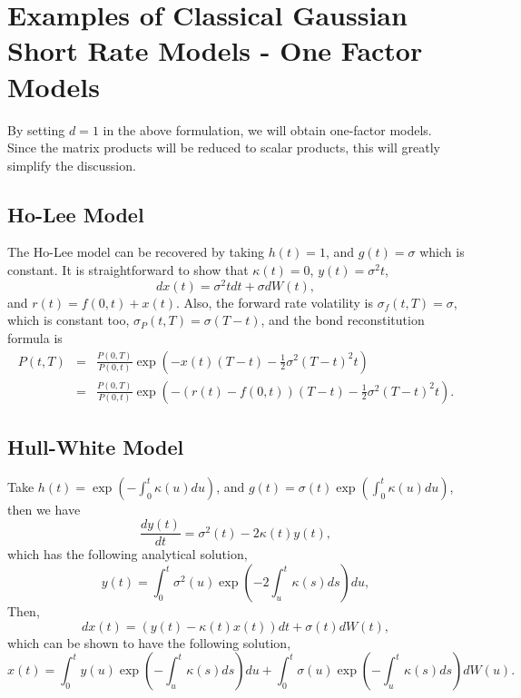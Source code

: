 \documentclass[12pt]{article}
\begin{document}
\section{Examples of Classical Gaussian Short Rate Models - One Factor Models}

  By setting $d=1$ in the above formulation, we will obtain one-factor models. Since the matrix products will be reduced to
  scalar products, this will greatly simplify the discussion.
  
  \subsection{Ho-Lee Model}

  The Ho-Lee model can be recovered by taking $h(t)=1$, and $g(t)=\sigma$ which is constant. It is straightforward to show that
  $\kappa(t)=0$, $y(t)=\sigma^2t$,
  \begin{equation}
    dx(t)=\sigma^2tdt+\sigma dW(t),
  \end{equation}
  and $r(t)=f(0,t)+x(t)$. Also, the forward rate volatility is $\sigma_f(t,T)=\sigma$, which is constant too, $\sigma_P(t,T)=\sigma(T-t)$, and the bond
  reconstitution formula is
  \begin{eqnarray}
    P(t,T)&=&\frac{P(0,T)}{P(0,t)}\exp\left(-x(t)(T-t)-\frac{1}{2}\sigma^2(T-t)^2t\right)\nonumber\\
          &=&\frac{P(0,T)}{P(0,t)}\exp\left(-\left(r(t)-f(0,t)\right)(T-t)-\frac{1}{2}\sigma^2(T-t)^2t\right).
  \end{eqnarray}
  
  
  \subsection{Hull-White Model}

  Take $h(t)=\exp\left(-\int_0^t\kappa(u)du\right)$, and $g(t)=\sigma(t)\exp\left(\int_0^t\kappa(u)du\right)$, then we have
  \begin{equation}
    \frac{dy(t)}{dt} = \sigma^2(t) - 2\kappa(t)y(t),
  \end{equation}
  which has the following analytical solution,
  \begin{equation}
    y(t)=\int_0^t\sigma^2(u)\exp\left(-2\int_u^t\kappa(s)ds\right)du,
  \end{equation}
  Then,
  \begin{equation}
    dx(t)=\left(y(t)-\kappa(t)x(t)\right)dt+\sigma(t)dW(t),
  \end{equation}
  which can be shown to have the following solution,
  \begin{equation}
    x(t)=\int_0^ty(u)\exp\left(-\int_u^t\kappa(s)ds\right)du+\int_0^t\sigma(u)\exp\left(-\int_u^t\kappa(s)ds\right)dW(u).
  \end{equation}
  
\end{document}
